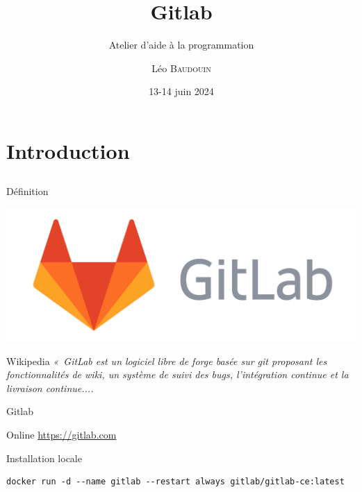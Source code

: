 \documentclass{beamer}
\title{Gitlab}
\subtitle{Atelier d'aide à la programmation}
\author{L\'eo \textsc{Baudouin}}
\institute{
  {\url{baudouin.leo @ gmail.com}}
}
\date{13-14 juin 2024}
\begin{document}
\begin{frame}
  \titlepage
\end{frame}

\section{Introduction}
\subsection{}

\begin{frame}{Définition}


\begin{center}
\includegraphics[width=0.5\linewidth]{images/gitlab-logo}
\end{center}

\begin{block}{Wikipedia}
{\it 
«~GitLab est un logiciel libre de forge basée sur git proposant les fonctionnalités de wiki, un système de suivi des bugs, l’intégration continue et la livraison continue....}
\end{block}
\end{frame}



\begin{frame}[fragile]{Gitlab}

\begin{block}{Online}
\href{https://gitlab.com}{https://gitlab.com}
\end{block}

\begin{block}{Installation locale}
\scriptsize
\begin{verbatim}
docker run -d --name gitlab --restart always gitlab/gitlab-ce:latest
\end{verbatim}
\end{block}


\end{frame}
\end{document}
